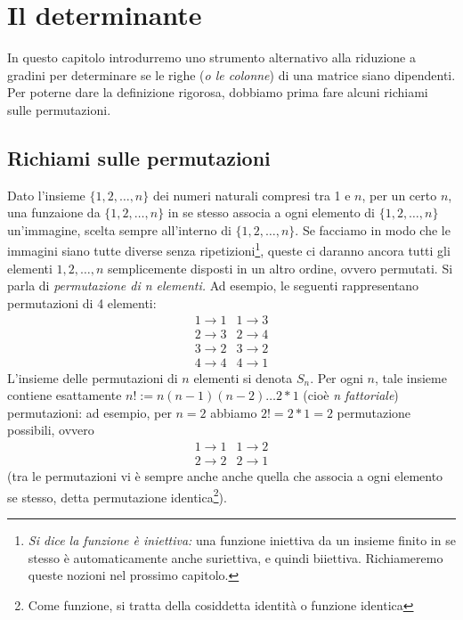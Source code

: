 \chapter{Il determinante \label{ildet}}
In questo capitolo introdurremo uno strumento alternativo alla riduzione a gradini per determinare se le righe ({\it o le colonne}) di una matrice
siano dipendenti. Per poterne dare la definizione rigorosa, dobbiamo prima fare alcuni richiami sulle permutazioni.
\section {Richiami sulle permutazioni \label{ricsullperm}}
Dato l'insieme $\{1,2,\dots,n\}$ dei numeri naturali compresi tra 1 e $n$, per un certo $n$, una funzaione
da $\{1,2,\dots,n\}$ in se stesso associa a ogni elemento di $\{1,2,\dots,n\}$ un'immagine, scelta sempre
all'interno di $\{1,2,\dots,n\}$. Se facciamo in modo che le immagini siano tutte diverse senza
ripetizioni\footnote{\textit{Si dice la funzione è iniettiva:} una funzione iniettiva da un insieme finito in
  se stesso è automaticamente anche suriettiva, e quindi biiettiva. Richiameremo queste nozioni nel prossimo capitolo.},
queste ci daranno ancora tutti gli elementi $1,2,\dots,n$ semplicemente disposti in un altro ordine, ovvero permutati.
Si parla di {\em permutazione di n elementi.} Ad esempio, le seguenti rappresentano permutazioni di 4 elementi:
\begin{equation*}
  \begin{matrix}
    1 \to 1 & 1 \to 3\\
    2 \to 3 & 2 \to 4\\
    3 \to 2 & 3 \to 2\\
    4 \to 4 & 4 \to 1
  \end{matrix}
\end{equation*}
L'insieme delle permutazioni di $n$ elementi si denota $S_n$. Per ogni $n$, tale insieme contiene esattamente $n!:=n(n-1)(n-2)\dots 2*1$ (cioè {\it n fattoriale}) permutazioni: ad esempio, per $n = 2$ abbiamo $2!= 2 * 1 = 2$ permutazione possibili, ovvero
\begin{equation*}
  \begin{matrix}
    1 \to 1 & 1 \to 2\\
    2 \to 2 & 2 \to 1
  \end{matrix}
\end{equation*}
(tra le permutazioni vi è sempre anche anche quella che associa a ogni elemento se stesso, detta permutazione identica\footnote{Come funzione, si tratta della cosiddetta identità o funzione identica}).\\
